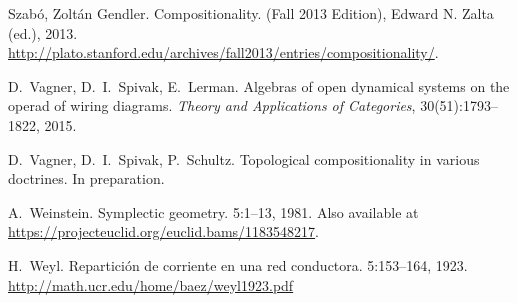 \begin{thebibliography}{RSW00}
    Szab\'o, Zolt\'an Gendler.
    \newblock Compositionality. 
    (Fall 2013 Edition), Edward N. Zalta (ed.), 2013.
    \newblock
    \href{http://plato.stanford.edu/archives/fall2013/entries/compositionality/}{http://plato.stanford.edu/archives/fall2013/entries/compositionality/}.


    D.\ Vagner, D.\ I.\ Spivak, E.\ Lerman.
    \newblock Algebras of open dynamical systems on the operad of wiring
    diagrams.
    \newblock \emph{Theory and Applications of Categories}, 30(51):1793--1822,
    2015. 

    D.\ Vagner, D.\ I.\ Spivak, P.\ Schultz.
    \newblock Topological compositionality in various doctrines.
    \newblock In preparation.






    A.\ Weinstein.
    \newblock Symplectic geometry.
     { 5}:1--13, 1981.
    \newblock Also available at 	
    \href{https://projecteuclid.org/euclid.bams/1183548217}
    {https://projecteuclid.org/euclid.bams/1183548217}.

    H.\ Weyl.
    \newblock Repartici\'on de corriente en una red conductora.
     { 5}:153--164, 1923.
    \newblock \href{http://math.ucr.edu/home/baez/weyl1923.pdf}{http://math.ucr.edu/home/baez/weyl1923.pdf}



\end{thebibliography}
